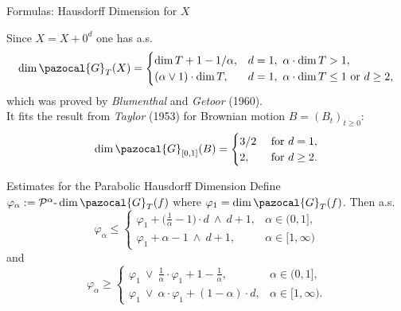 \documentclass{beamer}
\theoremstyle{plain}
\theoremstyle{definition}
\theoremstyle{remark}
\newcommand{\1}{\mathbbm{1}}
\newcommand{\m}{\text{-}}
\newcommand{\ph}{\varphi}
\begin{document}
\begin{frame}{Formulas: Hausdorff Dimension for $X$}

Since $X = X+0^d$ one has a.s.
\begin{equation*}
\dim \pazocal{G}_T(X) =
\begin{cases}
\dim T + 1 - 1/\alpha,  & d=1, \ \alpha\cdot \dim T > 1,\\
(\alpha \vee 1) \cdot \dim T,  & d=1, \ \alpha\cdot \dim T \leq 1\text{ or } d\geq2,
\end{cases} 
\end{equation*}
which was proved by \textit{Blumenthal} and \textit{Getoor} (1960).\\[30pt]

It fits the result from \textit{Taylor} (1953) for Brownian motion $B = (B_t)_{t\geq0}$:
\begin{equation*}
\dim \pazocal{G}_{[0,1]}(B) =
\begin{cases}
3/2  &\text{ for } d=1 ,\\
2,  &\text{ for } d\geq2.
\end{cases} 
\end{equation*}
\end{frame}

\begin{frame}{Estimates for the Parabolic Hausdorff Dimension}
Define $\ph_\alpha := \mathcal{P}^\alpha\m\dim \pazocal{G}_T(f)$ where $\ph_1 = \dim \pazocal{G}_T(f)$. Then a.s.
\begin{equation*}
\ph_\alpha \leq
\begin{cases}
\ph_1 + \big(\frac{1}{\alpha} - 1\big)\cdot d \ \wedge \ d + 1, & \alpha \in (0,1],\\
\ph_1 + \alpha - 1  \ \wedge \ d + 1, & \alpha \in [1,\infty)
\end{cases}
\end{equation*}
and
\begin{equation*}
\ph_\alpha \geq
\begin{cases}
\ph_1 \ \vee \ \frac{1}{\alpha} \cdot \ph_1 + 1 - \frac{1}{\alpha}, & \alpha \in (0,1],\\
\ph_1 \ \vee \ \alpha \cdot \ph_1 + (1-\alpha) \cdot d, & \alpha \in [1,\infty).
\end{cases}
\end{equation*}
\end{frame}
\end{document}
